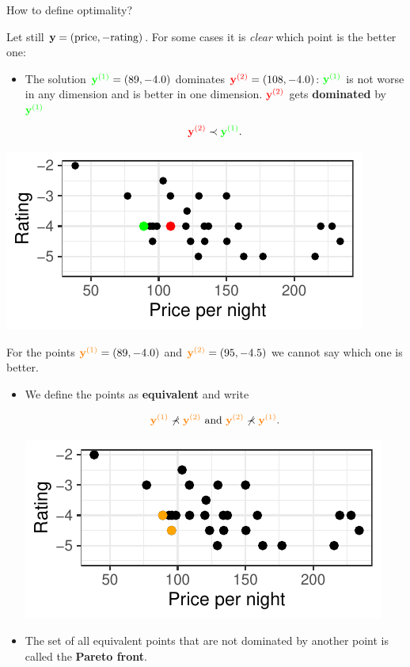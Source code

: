 \begin{frame}[allowframebreaks]{How to define optimality?}

Let still $\mathbf{y} = (\text{price}, - \text{rating})$. For some cases it is \textit{clear} which point is the better one:

\begin{itemize}
    \item The solution $\textcolor{green}{\mathbf{y}^{(1)}} = \left(89, - 4.0\right)$ dominates $\textcolor{red}{\mathbf{y}^{(2)}} = \left(108, - 4.0\right)$: $\textcolor{green}{\mathbf{y}^{(1)}}$ is not worse in any dimension and is better in one dimension. $\textcolor{red}{\mathbf{y}^{(2)}}$ gets \textbf{dominated} by $\textcolor{green}{\mathbf{y}^{(1)}}$
$$
\textcolor{red}{\mathbf{y}^{(2)}} \prec \textcolor{green}{\mathbf{y}^{(1)}}.
$$
\end{itemize}

\centering \includegraphics[width=0.5\linewidth]{images/expedia-3-1}

\framebreak

For the points $\textcolor{orange}{\mathbf{y}^{(1)}} = \left(89, - 4.0\right)$ and $\textcolor{orange}{\mathbf{y}^{(2)}} = \left(95, - 4.5\right)$ we cannot say which one is better.

\begin{itemize}
\item We define the points as \textbf{equivalent} and write

$$
\textcolor{orange}{\mathbf{y}^{(1)}} \not\prec \textcolor{orange}{\mathbf{y}^{(2)}} \text{ and } \textcolor{orange}{\mathbf{y}^{(2)}} \not\prec \textcolor{orange}{\mathbf{y}^{(1)}}.
$$

\centering \includegraphics[width=0.5\linewidth]{images/expedia-4-1}


\item The set of all equivalent points that are not dominated by another point is called the \textbf{Pareto front}.


\end{itemize}
\end{frame}
